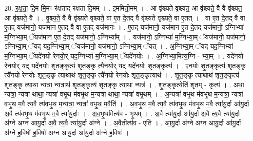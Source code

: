 \documentclass[17pt]{extarticle}
\begin{document}
20. र॒क्ष॒ता॒ दि॒म मि॒मꣳ र॑क्षताद् रक्षता दि॒मम् । . इ॒ममिती॒मम् । . आ वृ॑श्च्यते वृश्च्यत॒ आ वृ॑श्च्यते॒ वै वै वृ॑श्च्यत॒ आ वृ॑श्च्यते॒ वै । . वृ॒श्च्य॒ते॒ वै वै वृ॑श्च्यते वृश्च्यते॒ वा ए॒त दे॒तद् वै वृ॑श्च्यते वृश्च्यते॒ वा ए॒तत् । . वा ए॒त दे॒तद् वै वा ए॒तद् यज॑मानो॒ यज॑मान ए॒तद् वै वा ए॒तद् यज॑मानः । . ए॒तद् यज॑मानो॒ यज॑मान ए॒त दे॒तद् यज॑मानो॒ ऽग्निभ्या॑ म॒ग्निभ्या॒म् ॅयज॑मान ए॒त दे॒तद् यज॑मानो॒ ऽग्निभ्या᳚म् । . यज॑मानो॒ ऽग्निभ्या॑ म॒ग्निभ्या॒म् ॅयज॑मानो॒ यज॑मानो॒ ऽग्निभ्या॒म् ॅयद् यद॒ग्निभ्या॒म् ॅयज॑मानो॒ यज॑मानो॒ ऽग्निभ्या॒म् ॅयत् । . अ॒ग्निभ्या॒म् ॅयद् यद॒ग्निभ्या॑ म॒ग्निभ्या॒म् ॅयदे॑नयो रेनयो॒र् यद॒ग्निभ्या॑ म॒ग्निभ्या॒म् ॅयदे॑नयोः । . अ॒ग्निभ्या॒मित्य॒ग्नि - भ्या॒म् । . यदे॑नयो रेनयो॒र् यद् यदे॑नयोः शृत॒ङ्कृत्य॑ शृत॒ङ्कृ त्यै॑नयो॒र् यद् यदे॑नयोः शृत॒ङ्कृत्य॑ । . ए॒न॒योः॒ शृ॒त॒ङ्कृत्य॑ शृत॒ङ्कृ त्यै॑नयो रेनयोः शृत॒ङ्कृ त्याथाथ॑ शृत॒ङ्कृ त्यै॑नयो रेनयोः शृत॒ङ्कृत्याथ॑ । . शृ॒त॒ङ्कृ त्याथाथ॑ शृत॒ङ्कृत्य॑ शृत॒ङ्कृ त्याथा॒ न्यत्रा॒ न्यत्राथ॑ शृत॒ङ्कृत्य॑ शृत॒ङ्कृ त्याथा॒ न्यत्र॑ । . शृ॒त॒ङ्कृत्येति॑ शृतम् - कृत्य॑ । . अथा॒ न्यत्रा॒ न्यत्रा थाथा॒ न्यत्रा॑ वभृ॒थ म॑वभृ॒थ म॒न्यत्रा थाथा॒ न्यत्रा॑ वभृ॒थम् । . अ॒न्यत्रा॑ वभृ॒थ म॑वभृ॒थ म॒न्यत्रा॒ न्यत्रा॑ वभृ॒थ म॒वै त्य॒वै त्य॑वभृ॒थ म॒न्यत्रा॒ न्यत्रा॑ वभृ॒थ म॒वैति॑ । . अ॒व॒भृ॒थ म॒वै त्य॒वै त्य॑वभृ॒थ म॑वभृ॒थ म॒वै त्या॑यु॒र्दा आ॑यु॒र्दा अ॒वै त्य॑वभृ॒थ म॑वभृ॒थ म॒वै त्या॑यु॒र्दाः । . अ॒व॒भृ॒थमित्य॑व - भृ॒थम् । . अ॒वै त्या॑यु॒र्दा आ॑यु॒र्दा अ॒वै त्य॒वै त्या॑यु॒र्दा अ॑ग्ने अग्न आयु॒र्दा अ॒वै त्य॒वै त्या॑यु॒र्दा अ॑ग्ने । . अ॒वैतीत्य॑व - एति॑ । . आ॒यु॒र्दा अ॑ग्ने अग्न आयु॒र्दा आ॑यु॒र्दा अ॑ग्ने ह॒विषो॑ ह॒विषो॑ अग्न आयु॒र्दा आ॑यु॒र्दा अ॑ग्ने ह॒विषः॑ । \newline
\end{document}
